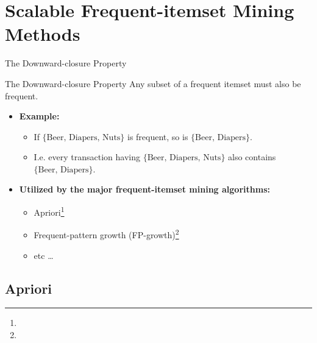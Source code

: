 \section{Scalable Frequent-itemset Mining Methods}

\begin{frame}{The Downward-closure Property}

	\begin{block}{The Downward-closure Property}
		Any subset of a frequent itemset must also be frequent.
	\end{block}

	\begin{itemize}
		\item \textbf{Example:}

		      \begin{itemize}
			      \item If $\{\text{Beer, Diapers, Nuts}\}$ is frequent, so is $\{\text{Beer, Diapers}\}$.
			      \item I.e. every transaction having $\{\text{Beer, Diapers, Nuts}\}$ also contains $\{\text{Beer, Diapers}\}$.
		      \end{itemize}
		\item \textbf{Utilized by the major frequent-itemset mining algorithms:}
		      \begin{itemize}
			      \item Apriori\footnote{}
			      \item Frequent-pattern growth (FP-growth)\footnote{}
			      \item etc \ldots
		      \end{itemize}
	\end{itemize}
\end{frame}

\subsection{Apriori}

